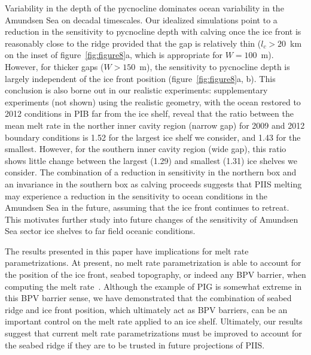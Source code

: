 \documentclass[draft]{agujournal2019}
\begin{document}
Variability in the depth of the pycnocline dominates ocean variability in the Amundsen Sea on decadal timescales. Our idealized simulations point to a reduction in the sensitivity to pycnocline depth with calving once the ice front is reasonably close to the ridge provided that the gap is relatively thin ($l_c > 20$~km on the inset of figure~\ref{fig:figure8}a, which is appropriate for $W=100$~m). However, for thicker gaps ($W > 150$~m), the sensitivity to pycnocline depth is largely independent of the ice front position (figure~\ref{fig:figure8}a, b). This conclusion is also borne out in our realistic experiments: supplementary experiments (not shown) using the realistic geometry, with the ocean restored to 2012 conditions in PIB far from the ice shelf, reveal that the ratio between the mean melt rate in the norther inner cavity region (narrow gap) for 2009 and 2012 boundary conditions is 1.52 for the largest ice shelf we consider, and 1.43 for the smallest. However, for the southern inner cavity region (wide gap), this ratio shows little change between the largest (1.29) and smallest (1.31) ice shelves we consider. The combination of a reduction in sensitivity in the northern box and an invariance in the southern box as calving proceeds suggests that PIIS melting may experience a reduction in the sensitivity to ocean conditions in the Amundsen Sea in the future, assuming that the ice front continues to retreat. This motivates further study into future changes of the sensitivity of Amundsen Sea sector ice shelves to far field oceanic conditions.

The results presented in this paper have implications for melt rate parametrizations. At present, no melt rate parametrization is able to account for the position of the ice front, seabed topography, or indeed any BPV barrier, when computing the melt rate~\cite{AsayDavis2017CurrClimChRep, Reese2018Cryo, Bradley2022}. Although the example of PIG is somewhat extreme in this BPV barrier sense, we have demonstrated that the combination of seabed ridge and ice front position, which ultimately act as BPV barriers, can be an important control on the melt rate applied to an ice shelf. Ultimately, our results suggest that current melt rate parametrizations must be improved to account for the seabed ridge if they are to be trusted in future projections of PIIS.
\end{document}
